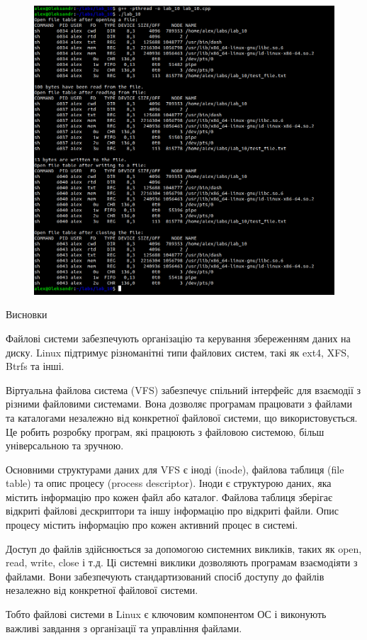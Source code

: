 \documentclass[a4paper,12pt]{article}
\begin{document}
\newpage
    \begin{figure}[h!]
        \begin{minipage}[h]{1\linewidth}
            \centering
            \includegraphics[width=0.8\linewidth]{Prt sc/Figure_2.png}  
        \end{minipage}
    \end{figure}
    \begin{center}
        \Large{Висновки}
    \end{center}

    Файлові системи забезпечують організацію та керування збереженням даних на диску. Linux підтримує різноманітні типи файлових систем, такі як ext4, XFS, Btrfs та інші.

    Віртуальна файлова система (VFS) забезпечує спільний інтерфейс для взаємодії з різними файловими системами. 
    Вона дозволяє програмам працювати з файлами та каталогами незалежно від конкретної файлової системи, що використовується. 
    Це робить розробку програм, які працюють з файловою системою, більш універсальною та зручною.

    Основними структурами даних для VFS є іноді (inode), файлова таблиця (file table) 
    та опис процесу (process descriptor). Іноди є структурою даних, яка містить інформацію про кожен файл або каталог. 
    Файлова таблиця зберігає відкриті файлові дескриптори та іншу інформацію про відкриті файли. Опис процесу містить інформацію про кожен активний процес в системі.

    Доступ до файлів здійснюється за допомогою системних викликів, таких як open, read, write, close і т.д. 
    Ці системні виклики дозволяють програмам взаємодіяти з файлами. Вони забезпечують стандартизований спосіб доступу до файлів незалежно від конкретної файлової системи.

    Тобто файлові системи в Linux є ключовим компонентом ОС і виконують важливі завдання з організації та управління файлами.
\end{document}
